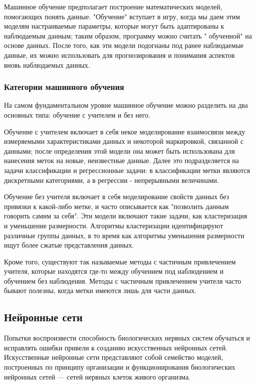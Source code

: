 Машинное обучение предполагает построение математических моделей, помогающих понять данные. "Обучение" вступает в игру, когда мы даем этим моделям настраиваемые параметры, которые могут быть адаптированы к наблюдаемым данным; таким образом, программу можно считать " обученной" на основе данных. После того, как эти модели подогнаны под ранее наблюдаемые данные, их можно использовать для прогнозирования и понимания аспектов вновь наблюдаемых данных.

\subsubsection{Категории машинного обучения}\label{ml}
На самом фундаментальном уровне машинное обучение можно разделить на два основных типа: обучение с учителем и без него.


Обучение с учителем включает в себя некое моделирование взаимосвязи между измеряемыми характеристиками данных и некоторой маркировкой, связанной с данными; после определения этой модели она может быть использована для нанесения меток на новые, неизвестные данные. Далее это подразделяется на задачи классификации и регрессионные задачи: в классификации метки являются дискретными категориями, а в регрессии - непрерывными величинами. 


Обучение без учителя включает в себя моделирование свойств данных без привязки к какой-либо метке, и часто описывается как "позволить данным говорить самим за себя". Эти модели включают такие задачи, как кластеризация и уменьшение размерности. Алгоритмы кластеризации идентифицируют различные группы данных, в то время как алгоритмы уменьшения размерности ищут более сжатые представления данных.


Кроме того, существуют так называемые методы с частичным привлечением учителя, которые находятся где-то между обучением под наблюдением и обучением без наблюдения. Методы с частичным привлечением учителя часто бывают полезны, когда метки имеются лишь для части данных.


\subsection{Нейронные сети} \label{neuralnets}
Попытки воспроизвести способность биологических нервных систем обучаться и исправлять ошибки привели к созданию искусственных нейронных сетей. Искусственные нейронные сети представляют собой семейство моделей, построенных по принципу организации и функционирования биологических нейронных сетей — сетей нервных клеток живого организма.


